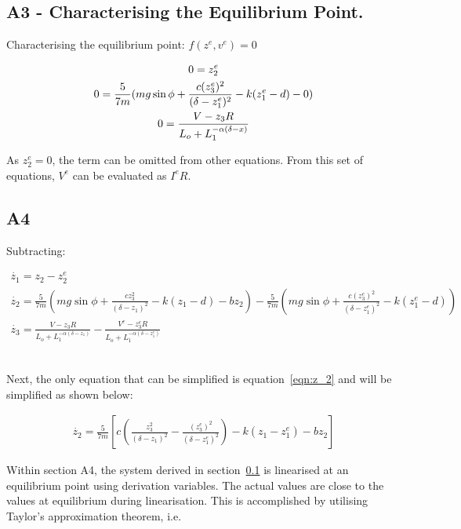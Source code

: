 \documentclass[a4paper,10pt,reqno]{amsart}
\numberwithin{equation}{section}
\begin{document}
\subsection{A3 - Characterising the Equilibrium Point.}\label{sec:A3} 

\par Characterising the equilibrium point: $f(z^e,v^e)=0$

\begin{gather}
    0=z_2^e
    \notag\\
    0=\frac{5}{7m}(mg\sin{\phi}+\frac{c(z_3^e)^2}{(\delta-z_1^e)^2}-k(z_1^e-d)-0)
    \notag\\
    0=\frac{V-z_3R}{L_o+L_1^{-\alpha(\delta-x)}}
\end{gather}

\par As $z_2^e=0$, the term can be omitted from other equations. From this set of equations, $V^e$ can be evaluated as $I^eR$.

\subsection{A4}\label{sec:A4}

\par Subtracting:

\begin{gather}
    \dot{z_1}=z_2-z_2^e
    \\
    \dot{z_2} = \frac{5}{7m}(mg\sin{\phi}+\frac{cz_3^2}{(\delta-z_1)^2}-k(z_1-d)-bz_2)-\frac{5}{7m}(mg\sin{\phi}+\frac{c(z_3^e)^2}{(\delta-z_1^e)^2}-k(z_1^e-d))
    \label{eqn:z_2}\\
    \dot{z_3}=\frac{V-z_3R}{L_o+L_1^{-\alpha(\delta-z_1)}}-\frac{V^e-z_3^eR}{L_o+L_1^{-\alpha(\delta-z_1^e)}}
\end{gather}
\\
\par Next, the only equation that can be simplified is equation~\ref{eqn:z_2} and will be simplified as shown below:

\begin{gather}
    \dot{z_2} = \frac{5}{7m}[c(\frac{z_3^2}{(\delta-z_1)^2}-\frac{(z_3^e)^2}{(\delta-z_1^e)^2})-k(z_1-z_1^e)-bz_2]
\end{gather}

\par Within section A4, the system derived in section~\ref{sec:A3} is linearised at an equilibrium point using derivation variables. The actual values are close to the values at equilibrium during linearisation. This is accomplished by utilising Taylor's approximation theorem, i.e.
\end{document}
